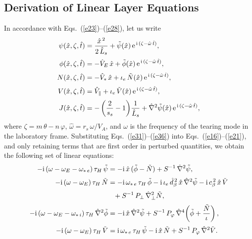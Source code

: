 \documentclass[12pt,prb,aps]{revtex4-1}
\begin{document}
\subsection{Derivation of Linear Layer Equations}
In accordance with Eqs.~(\ref{e23})--(\ref{e28}), let us write
\begin{align}\label{e31}
\psi(\hat{x},\zeta,\hat{t}) &= \frac{\hat{x}^{\,2} }{2\,\hat{L}_s}+ \tilde{\psi}(\hat{x})\,{\rm e}^{\,{\rm i}\,(\zeta-\hat{\omega}\,\hat{t})},\\[0.5ex]
\phi(\hat{x},\zeta,\hat{t}) &=-\hat{V}_E\,\hat{x}+ \tilde{\phi}(\hat{x})\,{\rm e}^{\,{\rm i}\,(\zeta-\hat{\omega}\,\hat{t})},\\[0.5ex]
N(\hat{x},\zeta,\hat{t}) &= -\hat{V}_\ast\,\hat{x}+\iota_e\,\tilde{N}(\hat{x})\,{\rm e}^{\,{\rm i}\,(\zeta-\hat{\omega}\,\hat{t})},\\[0.5ex]
V(\hat{x},\zeta,\hat{t}) &= \hat{V}_\parallel +\iota_e\,\tilde{V}(\hat{x})\,{\rm e}^{\,{\rm i}\,(\zeta-\hat{\omega}\,\hat{t})},\\[0.5ex]
J(\hat{x},\zeta,\hat{t}) &=-\left(\frac{2}{s_s}-1\right)\!\frac{1}{\hat{L}_s}+ \hat{\nabla}^2\tilde{\psi}(\hat{x})\,{\rm e}^{\,{\rm i}\,(\zeta-\hat{\omega}\,\hat{t})},\label{e36}
\end{align}
where $\zeta=m\,\theta-n\,\varphi$, $\hat{\omega}=r_s\,\omega/V_A$, and $\omega$ is the frequency of the tearing mode in the laboratory frame. 
Substituting Eqs.~(\ref{e31})--(\ref{e36}) into Eqs.~(\ref{e16})--(\ref{e21}), 
 and only retaining terms that
are first order in perturbed quantities, we obtain the following set of linear equations:
\begin{align}\label{e37}
-{\rm i}\,(\omega-\omega_E -\omega_{\ast\,e})\,\tau_H\,\tilde{\psi} &= -{\rm i} \,\hat{x}\,(\tilde{\phi}-\tilde{N})+ S^{-1}\,\hat{\nabla}^2\tilde{\psi},\\[0.5ex]
-{\rm i}\,(\omega-\omega_E)\,\tau_H\,\tilde{N} &= -{\rm i}\,\omega_{\ast\,e}\,\tau_H\,\tilde{\phi}- {\rm i}\,\iota_e\,\hat{d}_\beta^{\,2}\,\hat{x}\,\hat{\nabla}^2\tilde{\psi}-{\rm i}\,c_\beta^{\,2}\,\hat{x}\,\tilde{V} \nonumber\\[0.5ex]
&\phantom{=} + S^{-1}\,P_\perp\,\hat{\nabla}_\perp^2 \tilde{N},\\[0.5ex]
-{\rm i}\,(\omega-\omega_E-\omega_{\ast\,i})\,\tau_H\,\hat{\nabla}^2\tilde{\phi} &= -{\rm i}\,\hat{x}\,\hat{\nabla}^2\tilde{\psi}+S^{-1}\,P_\varphi\,\hat{\nabla}^4\!\left(\tilde{\phi} + \frac{\tilde{N}}{\iota}\right),\\[0.5ex]
-{\rm i}\,(\omega-\omega_E)\,\tau_H\,\tilde{V} &= {\rm i}\,\omega_{\ast\,e}\,\tau_H\,\tilde{\psi} - {\rm i}\,\hat{x}\,\tilde{N}
+ S^{-1}\,P_\varphi\,\hat{\nabla}^2\tilde{V}.\label{e40}
\end{align}
\end{document}
